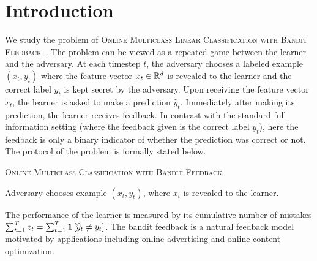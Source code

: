 \section{Introduction}
\label{section:introduction}

We study the problem of \textsc{Online Multiclass Linear Classification with
Bandit Feedback}~\citep{Kakade-Shalev-Shwartz-Tewari-2008}. The problem can be
viewed as a repeated game between the learner and the adversary. At each
timestep $t$, the adversary chooses a labeled example $(x_t, y_t)$ where the
feature vector $x_t \in \mathbb{R}^d$ is revealed to the learner and the correct label
$y_t$ is kept secret by the adversary. Upon receiving the feature vector $x_t$,
the learner is asked to make a prediction $\widehat{y}_t$. Immediately after
making its prediction, the learner receives feedback. In contrast with the
standard full information setting (where the feedback given is the correct label
$y_t$), here the feedback is only a binary indicator of whether the prediction
was correct or not. The protocol of the problem is formally stated below.

\begin{protocol}[h]
\caption{\textsc{Online Multiclass Classification with Bandit Feedback}
\label{algorithm:game-protocol}}
\begin{algorithmic}[1]
{
\STATE Adversary chooses example $(x_t, y_t)$, where $x_t$ is revealed to the learner.
\ENDFOR
}
\end{algorithmic}
\end{protocol}

The performance of the learner is measured by its cumulative number of
mistakes $\sum_{t=1}^T z_t = \sum_{t=1}^T \mathbf{1}\left[\widehat y_t \neq y_t \right]$.
The bandit feedback is a natural feedback model motivated by applications
including online advertising and online content optimization.

